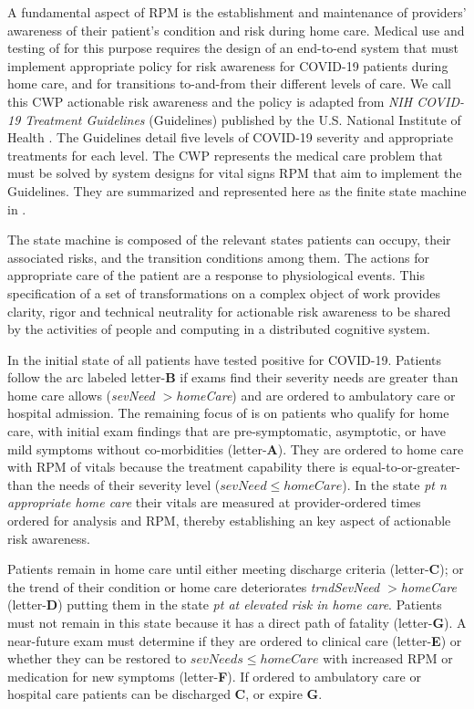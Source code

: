 A fundamental aspect of RPM is the establishment and maintenance of providers' awareness of their patient’s condition and risk during home care.
Medical use and testing of \phware for this purpose requires the design of an end-to-end system that must implement appropriate policy for risk awareness for COVID-19 patients during home care, and for transitions to-and-from their different levels of care.
We call this CWP actionable risk awareness and the policy is adapted from \emph{NIH COVID-19 Treatment Guidelines} (Guidelines) published by the U.S. National Institute of Health \cite{NIH}.
The Guidelines detail five levels of COVID-19 severity and appropriate treatments for each level.
The CWP represents the medical care problem that must be solved by system designs for vital signs RPM that aim to implement the Guidelines.
They are summarized and represented here as the finite state machine in .

The state machine is composed of the relevant states patients can occupy, their associated risks, and the transition conditions among them. The actions for appropriate care of the patient are a response to physiological events. This specification of a set of transformations on a complex object of work provides clarity, rigor and technical neutrality for actionable risk awareness to be shared by the activities of people and computing in a distributed cognitive system.

In the initial state of  all patients have tested positive for COVID-19. Patients follow the arc labeled letter-\textbf{B} if exams find their severity needs are greater than home care allows (\emph{sevNeed $>$homeCare}) and are ordered to ambulatory care or hospital admission.
The remaining focus of  is on patients who qualify for home care, with initial exam findings that are pre-symptomatic, asymptotic, or have mild symptoms without co-morbidities (letter-\textbf{A}).
They are ordered to home care with RPM of vitals because the treatment capability there is equal-to-or-greater-than the needs of their severity level (\emph{$sevNeed \le homeCare$}).
In the state \emph{pt n appropriate home care} their vitals are measured at provider-ordered times ordered for analysis and RPM, thereby establishing an key aspect of actionable risk awareness.

Patients remain in home care until either meeting discharge criteria (letter-\textbf{C}); or the trend of their condition or home care deteriorates \emph{trndSevNeed $>$homeCare} (letter-\textbf{D}) putting them in the state \emph{pt at elevated risk in home care}.
Patients must not remain in this state because it has a direct path of fatality (letter-\textbf{G}).
A near-future exam must determine if they are ordered to clinical care (letter-\textbf{E}) or whether they can be restored to \emph{$sevNeeds\le homeCare$} with increased RPM or medication for new symptoms (letter-\textbf{F}).
If ordered to ambulatory care or hospital care patients can be discharged \textbf{C}, or expire \textbf{G}.

